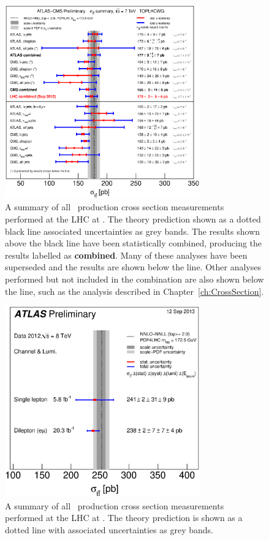 \begin{figure}[htbp]
  \centering
  \includegraphics[width=0.75\textwidth]{PartTopQuark/Plots/tt_xsec_7TeV.eps}
  \caption[A summary of all \ttbar\ production cross section measurements performed at the LHC at \cmsS.]{A summary of all \ttbar\ production cross section measurements performed at the LHC at \cmsS. The theory prediction shown as a dotted black line associated uncertainties as grey bands. The results shown above the black line have been statistically combined, producing the results labelled as \textbf{combined}. Many of these analyses have been superseded and the results are shown below the line. Other analyses performed but not included in the combination are also shown below the line, such as the analysis described in Chapter~\ref{ch:CrossSection}.}\label{fig:TopQuarkPairProductionSummaryLHC}
\end{figure}

\begin{figure}[htbp]
  \centering
  \includegraphics[width=0.75\textwidth]{PartTopQuark/Plots/tt_xsec_8TeV.eps}
  \caption[A summary of all \ttbar\ production cross section measurements performed at the LHC at \cmsE.]{A summary of all \ttbar\ production cross section measurements performed at the LHC at \cmsE. The theory prediction is shown as a dotted line with associated uncertainties as grey bands.}\label{fig:TopQuarkPairProduction8TeV}
\end{figure}

